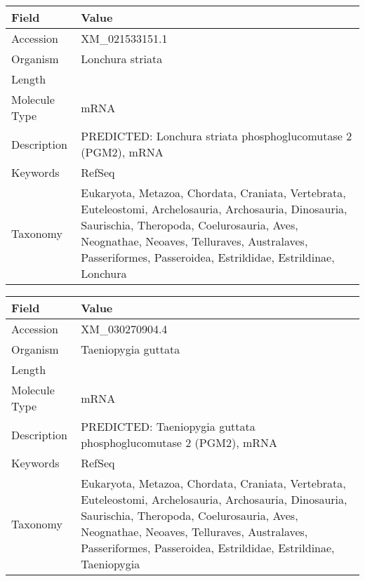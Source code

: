 \documentclass[10pt]{article}
\begin{document}
\vspace{1em}
{\footnotesize
\begin{longtable}{>{\raggedright\arraybackslash}p{4.5cm} >{\raggedright\arraybackslash}p{11.5cm}}
\textbf{Field} & \textbf{Value} \\
\hline
Accession & XM\_021533151.1 \\
Organism & Lonchura striata \\
Length & 5634 \\
Molecule Type & mRNA \\
Description & PREDICTED: Lonchura striata phosphoglucomutase 2 (PGM2), mRNA \\
Keywords & RefSeq \\
Taxonomy & Eukaryota, Metazoa, Chordata, Craniata, Vertebrata, Euteleostomi, Archelosauria, Archosauria, Dinosauria, Saurischia, Theropoda, Coelurosauria, Aves, Neognathae, Neoaves, Telluraves, Australaves, Passeriformes, Passeroidea, Estrildidae, Estrildinae, Lonchura \\
\end{longtable}
}

\vspace{1em}
{\footnotesize
\begin{longtable}{>{\raggedright\arraybackslash}p{4.5cm} >{\raggedright\arraybackslash}p{11.5cm}}
\textbf{Field} & \textbf{Value} \\
\hline
Accession & XM\_030270904.4 \\
Organism & Taeniopygia guttata \\
Length & 2173 \\
Molecule Type & mRNA \\
Description & PREDICTED: Taeniopygia guttata phosphoglucomutase 2 (PGM2), mRNA \\
Keywords & RefSeq \\
Taxonomy & Eukaryota, Metazoa, Chordata, Craniata, Vertebrata, Euteleostomi, Archelosauria, Archosauria, Dinosauria, Saurischia, Theropoda, Coelurosauria, Aves, Neognathae, Neoaves, Telluraves, Australaves, Passeriformes, Passeroidea, Estrildidae, Estrildinae, Taeniopygia \\
\end{longtable}
}
\end{document}
